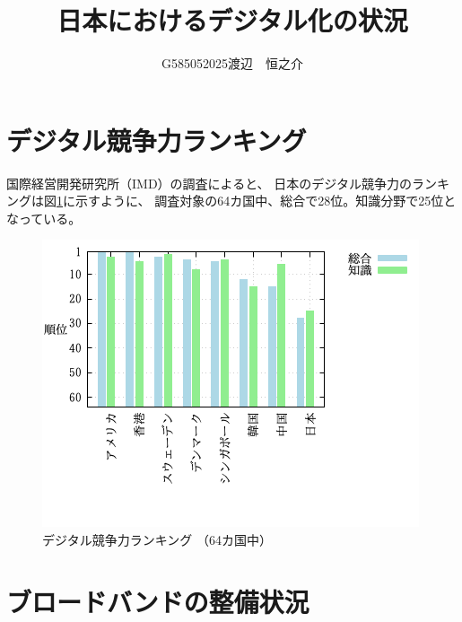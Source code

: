 \documentclass[a4paper,11pt,dvipdfmx]{ujarticle}
\title{日本におけるデジタル化の状況}
\author{G585052025渡辺　恒之介}
\begin{document}
\maketitle %

\section{デジタル競争力ランキング}

国際経営開発研究所（IMD）の調査\cite{imd}によると、
日本のデジタル競争力のランキングは図\ref{zu}に示すように、
調査対象の64カ国中、総合で28位。知識分野で25位となっている。

\begin{figure}[htbp]
    \label{zu}
    \centering
    \includegraphics{fig31.png}
    \caption{デジタル競争力ランキング （64カ国中）}
\end{figure}

\section{ブロードバンドの整備状況}
\end{document}
